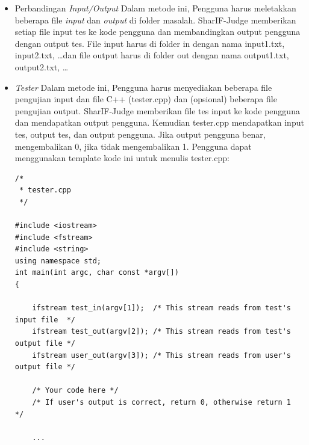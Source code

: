 \begin{itemize}
    \begin{itemize}
        \item Perbandingan \textit{Input/Output} \newline
        Dalam metode ini, Pengguna harus meletakkan beberapa file \textit{input} dan \textit{output} di folder masalah. SharIF-Judge memberikan setiap file input tes ke kode pengguna dan membandingkan output pengguna dengan output tes. File input harus di folder in dengan nama input1.txt, input2.txt, \ldots dan file output harus di folder out dengan nama output1.txt, output2.txt, \ldots
        \item \textit{Tester}\newline
        Dalam metode ini, Pengguna harus menyediakan beberapa file pengujian input dan file C++ (tester.cpp) dan (opsional) beberapa file pengujian output. SharIF-Judge memberikan file tes input ke kode pengguna dan mendapatkan output pengguna. Kemudian tester.cpp mendapatkan input tes, output tes, dan output pengguna. Jika output pengguna benar, mengembalikan 0, jika tidak mengembalikan 1.
        Pengguna dapat menggunakan template kode ini untuk menulis tester.cpp: 
        \begin{verbatim}
/*
 * tester.cpp
 */
 
#include <iostream>
#include <fstream>
#include <string>
using namespace std;
int main(int argc, char const *argv[])
{
 
	ifstream test_in(argv[1]);  /* This stream reads from test's input file  */
	ifstream test_out(argv[2]); /* This stream reads from test's output file */
	ifstream user_out(argv[3]); /* This stream reads from user's output file */
 
	/* Your code here */
	/* If user's output is correct, return 0, otherwise return 1       */
 
	...
 

\end{verbatim}
\end{itemize}
\end{itemize}
